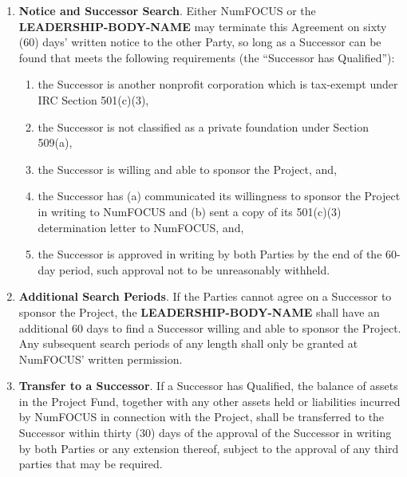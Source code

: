 \documentclass[letterpaper,12pt]{article}
\newcommand{\leadershipbody}{\textbf{LEADERSHIP-BODY-NAME}}
\begin{document}
\begin{enumerate}[label=\arabic*.,ref=\S~\arabic*]
\begin{enumerate}[label=\alph*.,ref=\theenumi(\arabic*)]

\item \textbf{Notice and Successor Search}. Either NumFOCUS or the
  \leadershipbody{} may terminate this Agreement on sixty (60) days' written
  notice to the other Party, so long as a Successor can be found that meets the
  following requirements (the ``Successor has Qualified''):


\begin{enumerate}[label=\roman*.,ref=\theenumi(\alph{enumii})(\roman*)]
  
\item the Successor is another nonprofit corporation which is tax-exempt under
  IRC Section 501(c)(3),
  
\item the Successor is not classified as a private foundation under Section
  509(a),
  
\item the Successor is willing and able to sponsor the Project, and,
  
\item the Successor has (a) communicated its willingness to sponsor the Project
  in writing to NumFOCUS and (b) sent a copy of its 501(c)(3) determination
  letter to NumFOCUS, and,
  
\item the Successor is approved in writing by both Parties by the end of the
  60-day period, such approval not to be unreasonably withheld.
  
\end{enumerate}

\item \textbf{Additional Search Periods}. If the Parties cannot agree on a
  Successor to sponsor the Project, the \leadershipbody{} shall have an
  additional 60 days to find a Successor willing and able to sponsor the
  Project. Any subsequent search periods of any length shall only be granted at
  NumFOCUS' written permission.

\item \textbf{Transfer to a Successor}. If a Successor has Qualified, the
  balance of assets in the Project Fund, together with any other assets held or
  liabilities incurred by NumFOCUS in connection with the Project, shall be
  transferred to the Successor within thirty (30) days of the approval of the
  Successor in writing by both Parties or any extension thereof, subject to the
  approval of any third parties that may be required.


\end{enumerate}
\end{enumerate}
\end{document}
